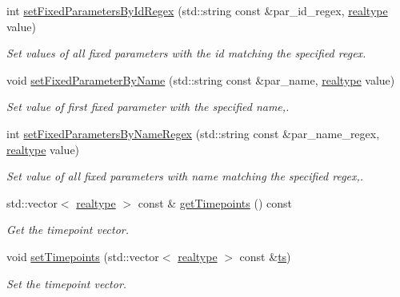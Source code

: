 \begin{DoxyCompactItemize}
int \mbox{\hyperlink{classamici_1_1_model_acda9b9debfd3d6ac77e2d27a48bfb5d6}{set\+Fixed\+Parameters\+By\+Id\+Regex}} (std\+::string const \&par\+\_\+id\+\_\+regex, \mbox{\hyperlink{namespaceamici_a1bdce28051d6a53868f7ccbf5f2c14a3}{realtype}} value)
\begin{DoxyCompactList}\small\item\em Set values of all fixed parameters with the id matching the specified regex. \end{DoxyCompactList}\item 
void \mbox{\hyperlink{classamici_1_1_model_af1225439bd6deceb98b224e75a960800}{set\+Fixed\+Parameter\+By\+Name}} (std\+::string const \&par\+\_\+name, \mbox{\hyperlink{namespaceamici_a1bdce28051d6a53868f7ccbf5f2c14a3}{realtype}} value)
\begin{DoxyCompactList}\small\item\em Set value of first fixed parameter with the specified name,. \end{DoxyCompactList}\item 
int \mbox{\hyperlink{classamici_1_1_model_a4802f7d56264e3b592c167da8166cb73}{set\+Fixed\+Parameters\+By\+Name\+Regex}} (std\+::string const \&par\+\_\+name\+\_\+regex, \mbox{\hyperlink{namespaceamici_a1bdce28051d6a53868f7ccbf5f2c14a3}{realtype}} value)
\begin{DoxyCompactList}\small\item\em Set value of all fixed parameters with name matching the specified regex,. \end{DoxyCompactList}\item 
std\+::vector$<$ \mbox{\hyperlink{namespaceamici_a1bdce28051d6a53868f7ccbf5f2c14a3}{realtype}} $>$ const  \& \mbox{\hyperlink{classamici_1_1_model_a50ea5198d117f8f4ad1e34bb279975c8}{get\+Timepoints}} () const
\begin{DoxyCompactList}\small\item\em Get the timepoint vector. \end{DoxyCompactList}\item 
void \mbox{\hyperlink{classamici_1_1_model_a50f9642f9bcb883dbd3925c85abc4c24}{set\+Timepoints}} (std\+::vector$<$ \mbox{\hyperlink{namespaceamici_a1bdce28051d6a53868f7ccbf5f2c14a3}{realtype}} $>$ const \&\mbox{\hyperlink{classamici_1_1_model_aa7014a80e7b102f85a10e3b9a480e8e5}{ts}})
\begin{DoxyCompactList}\small\item\em Set the timepoint vector. \end{DoxyCompactList}\item 

\end{DoxyCompactItemize}

